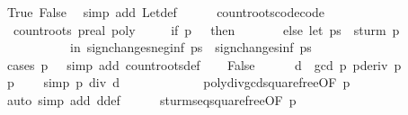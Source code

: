 \begin{isabellebody}
\ True\ False\ \isamarkupfalse%
\ {\isacharparenleft}simp\ add{\isacharcolon}\ Let{\isacharunderscore}def{\isacharparenright}\isanewline
\ \ \ \ \isamarkupfalse%
\isanewline
{}\isamarkupfalse%
%
\endisatagproof
{\isafoldproof}%
%
\isadelimproof
\isanewline
%
\endisadelimproof
\isanewline
\isanewline
{}\isamarkupfalse%
\ count{\isacharunderscore}roots{\isacharunderscore}code{\isacharbrackleft}code{\isacharbrackright}{\isacharcolon}\ \isanewline
\ \ {\isachardoublequoteopen}count{\isacharunderscore}roots\ {\isacharparenleft}p{\isacharcolon}{\isacharcolon}real\ poly{\isacharparenright}\ {\isacharequal}\isanewline
\ \ \ \ {\isacharparenleft}if\ p\ {\isacharequal}\ {}\ then\ {}\ \isanewline
\ \ \ \ \ else\ let\ ps\ {\isacharequal}\ sturm\ p\ \isanewline
\ \ \ \ \ \ \ \ \ \ \ in\ sign{\isacharunderscore}changes{\isacharunderscore}neg{\isacharunderscore}inf\ ps\ {\isacharminus}\ sign{\isacharunderscore}changes{\isacharunderscore}inf\ ps{\isacharparenright}{\isachardoublequoteclose}\isanewline
%
\isadelimproof
%
\endisadelimproof
%
\isatagproof
{}\isamarkupfalse%
\ {\isacharparenleft}cases\ {\isachardoublequoteopen}p\ {\isacharequal}\ {}{\isachardoublequoteclose}{\isacharcomma}\ simp\ add{\isacharcolon}\ count{\isacharunderscore}roots{\isacharunderscore}def{\isacharparenright}\isanewline
\ \ \isamarkupfalse%
\ False\isanewline
\ \ \ \ \isamarkupfalse%
\ d\ {\isasymequiv}\ {\isachardoublequoteopen}gcd\ p\ {\isacharparenleft}pderiv\ p{\isacharparenright}{\isachardoublequoteclose}\isanewline
\ \ \ \ \isamarkupfalse%
\ {\isacharbackquoteopen}p\ {\isasymnoteq}\ {}{\isacharbackquoteclose}\ \isamarkupfalse%
\ {\isacharbrackleft}simp{\isacharbrackright}{\isacharcolon}\ {\isachardoublequoteopen}p\ div\ d\ {\isasymnoteq}\ {}{\isachardoublequoteclose}\ \isanewline
\ \ \ \ \ \ \ \ \isamarkupfalse%
\ poly{\isacharunderscore}div{\isacharunderscore}gcd{\isacharunderscore}squarefree{\isacharparenleft}{}{\isacharparenright}{\isacharbrackleft}OF\ {\isacharbackquoteopen}p\ {\isasymnoteq}\ {}{\isacharbackquoteclose}{\isacharbrackright}\ \isamarkupfalse%
\ {\isacharparenleft}auto\ simp\ add{\isacharcolon}\ d{\isacharunderscore}def{\isacharparenright}\isanewline
\ \ \ \ \isamarkupfalse%
\ sturm{\isacharunderscore}seq{\isacharunderscore}squarefree{\isacharprime}{\isacharbrackleft}OF\ {\isacharbackquoteopen}p\ {\isasymnoteq}\ {}{\isacharbackquoteclose}{\isacharbrackright}\isanewline

\end{isabellebody}
